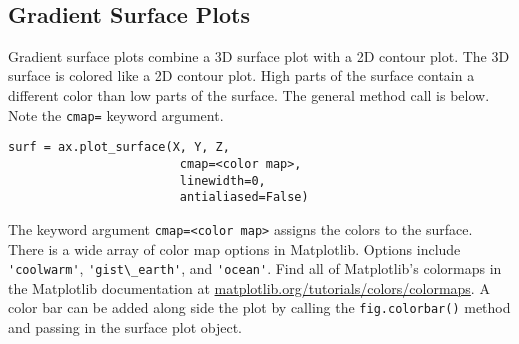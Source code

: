\documentclass{book}
\newcommand{\passthrough}[1]{#1}
\begin{document}
    \begin{center}
    \end{center}
    { \hspace*{\fill} \\}
    

    
        \hypertarget{gradient-surface-plots}{%
\subsection{Gradient Surface Plots}\label{gradient-surface-plots}}
    




    
        Gradient surface plots combine a 3D surface plot with a 2D contour plot.
The 3D surface is colored like a 2D contour plot. High parts of the
surface contain a different color than low parts of the surface. The
general method call is below. Note the \passthrough{\lstinline!cmap=!}
keyword argument.

\begin{lstlisting}
surf = ax.plot_surface(X, Y, Z, 
                        cmap=<color map>,
                        linewidth=0,
                        antialiased=False)
\end{lstlisting}

The keyword argument \passthrough{\lstinline!cmap=<color map>!} assigns
the colors to the surface. There is a wide array of color map options in
Matplotlib. Options include \passthrough{\lstinline!'coolwarm'!},
\passthrough{\lstinline!'gist\_earth'!}, and
\passthrough{\lstinline!'ocean'!}. Find all of Matplotlib's colormaps in
the Matplotlib documentation at
\href{https://matplotlib.org/tutorials/colors/colormaps.html}{matplotlib.org/tutorials/colors/colormaps}.
A color bar can be added along side the plot by calling the
\passthrough{\lstinline!fig.colorbar()!} method and passing in the
surface plot object.
    
\end{document}
